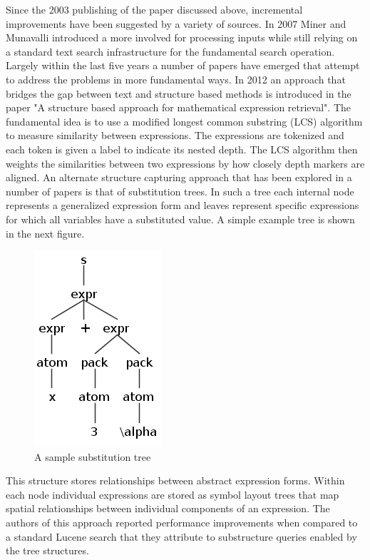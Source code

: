\documentclass{sig-alternate}
\begin{document}
Since the 2003 publishing of the paper discussed above, incremental
improvements have been suggested by a variety of sources. In 2007 Miner
and Munavalli introduced a more involved for processing inputs while
still relying on a standard text search infrastructure for the 
fundamental search operation.\cite{miner:approach} Largely within the last five years a number of 
papers have emerged that attempt to address the problems in more
fundamental ways.
In 2012 an approach that bridges the gap between text and structure based
methods is introduced in the paper "A structure based
approach for mathematical expression retrieval".\cite{kumar:structure} The fundamental
idea is to use a modified longest common substring (LCS) algorithm to 
measure similarity between expressions. The expressions are tokenized
and each token is given a label to indicate its nested depth. The LCS
algorithm then weights the similarities between two expressions by how
closely depth markers are aligned. 
An alternate structure capturing approach that has been explored in
a number of papers is that of substitution trees.\cite{kolhase:mathwebsearch}\cite{yuan:layout} In such a tree each
internal node represents a generalized expression form and leaves
represent specific expressions for which all variables have a 
substituted value. A simple example tree is shown in the next figure.
\begin{figure}
	\centering
    \includegraphics[scale=0.75]{subtree}
	\caption{A sample substitution tree}
\end{figure}
This structure stores relationships between abstract expression forms.
Within each node individual expressions are stored as symbol layout trees
that map spatial relationships between individual components of an expression.
The authors of this approach reported performance improvements when compared
to a standard Lucene search that they attribute to substructure queries 
enabled by the tree structures. 
\end{document}
